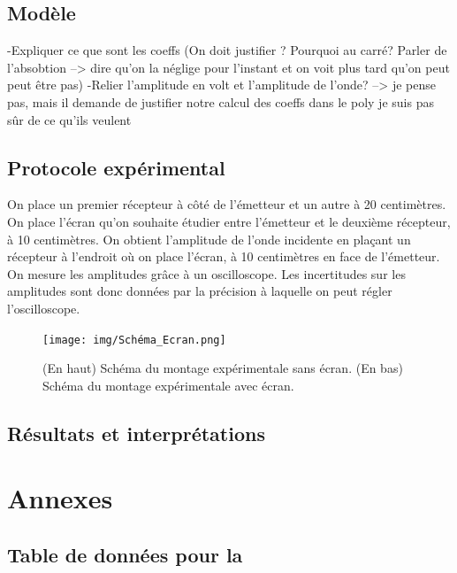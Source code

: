 \documentclass[12pt]{article}
\begin{document}
\subsection{Modèle}
-Expliquer ce que sont les coeffs (On doit justifier ? Pourquoi au carré? Parler de l'absobtion --> dire qu'on la néglige pour l'instant et on voit plus tard qu'on peut peut être pas)
-Relier l'amplitude en volt et l'amplitude de l'onde? --> je pense pas, mais il demande de justifier notre calcul des coeffs dans le poly je suis pas sûr de ce qu'ils veulent

\subsection{Protocole expérimental}

On place un premier récepteur à côté de l'émetteur et un autre à 20 centimètres. On place l'écran qu'on souhaite étudier entre l'émetteur et le deuxième récepteur, à 10 centimètres. On obtient l'amplitude de l'onde incidente en plaçant un récepteur à l'endroit où on place l'écran, à 10 centimètres en face de l'émetteur. On mesure les amplitudes grâce à un oscilloscope. Les incertitudes sur les amplitudes sont donc données par la précision à laquelle on peut régler l'oscilloscope. 

\begin{figure}[h!]
	\begin{center}
		\texttt{[image: img/Schéma\_Ecran.png]}
		\label{Schéma Ecran}
		\caption{(En haut) Schéma du montage expérimentale sans écran. (En bas) Schéma du montage expérimentale avec écran.}
	\end{center}
\end{figure} 

\subsection{Résultats et interprétations}

\break
\section*{Annexes}
\subsection*{Table de données pour la }
\end{document}
